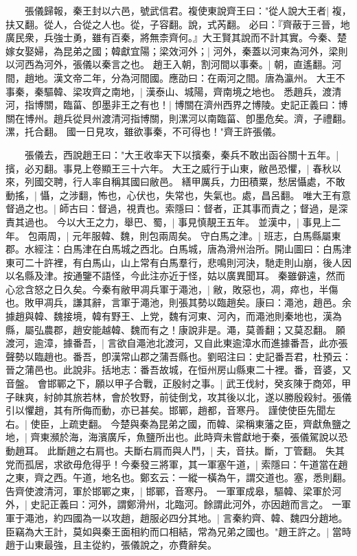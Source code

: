 　　張儀歸報，秦王封以六邑，號武信君。複使東說齊王曰："從人說大王者|{
	複，扶又翻。從人，合從之人也。從，子容翻。說，式芮翻。
	}
必曰：『齊蔽于三晉，地廣民衆，兵強士勇，雖有百秦，將無柰齊何。』大王賢其說而不計其實。今秦、楚嫁女娶婦，為昆弟之國；韓獻宜陽；梁效河外；|{
	河外，秦蓋以河東為河外，梁則以河西為河外，張儀以秦言之也。
	}
趙王入朝，割河間以事秦。|{
	朝，直遙翻。河間，趙地。漢文帝二年，分為河間國。應劭曰：在兩河之間。唐為瀛州。
	}
大王不事秦，秦驅韓、梁攻齊之南地，|{
	漢泰山、城陽，齊南境之地也。
	}
悉趙兵，渡清河，指博關，臨菑、卽墨非王之有也！|{
	博關在濟州西界之博陵。史記正義曰：博關在博州。趙兵從貝州渡清河指博關，則漯河以南臨菑、卽墨危矣。濟，子禮翻。漯，托合翻。
	}
國一日見攻，雖欲事秦，不可得也！"齊王許張儀。

　　張儀去，西說趙王曰："大王收率天下以擯秦，秦兵不敢出函谷關十五年。|{
	擯，必刃翻。事見上卷顯王三十六年。
	}
大王之威行于山東，敝邑恐懼，|{
	春秋以來，列國交聘，行人率自稱其國曰敝邑。
	}
繕甲厲兵，力田積粟，愁居懾處，不敢動搖，|{
	懾，之涉翻，怖也，心伏也，失常也，失氣也。處，昌呂翻。
	}
唯大王有意督過之也。|{
	師古曰：督過，視責也。索隱曰：督者，正其事而責之；督過，是深責其過也。
	}
今以大王之力，舉巴、蜀，|{
	事見慎靚王五年。
	}
並漢中，|{
	事見上二年。
	}
包兩周，|{
	元年服韓、魏，則包兩周矣。
	}
守白馬之津。|{
	班志，白馬縣屬東郡。水經注：白馬津在白馬城之西北。白馬城，唐為滑州治所。開山圖曰：白馬津東可二十許裡，有白馬山，山上常有白馬羣行，悲鳴則河決，馳走則山崩，後人因以名縣及津。按通鑒不語怪，今此注亦近于怪，姑以廣異聞耳。
	}
秦雖僻遠，然而心忿含怒之日久矣。今秦有敝甲凋兵軍于澠池，|{
	敝，敗惡也，凋，瘁也，半傷也。敗甲凋兵，謙其辭，言軍于澠池，則張其勢以臨趙矣。康曰：澠池，趙邑。余據趙與韓、魏接境，韓有野王、上党，魏有河東、河內，而澠池則秦地也，漢為縣，屬弘農郡，趙安能越韓、魏而有之！康說非是。澠，莫善翻；又莫忍翻。
	}
願渡河，逾漳，據番吾，|{
	言欲自澠池北渡河，又自此東逾漳水而進據番吾，此亦張聲勢以臨趙也。番吾，卽漢常山郡之蒲吾縣也。劉昭注曰：史記番吾君，杜預云：晉之蒲邑也。此說非。括地志：番吾故城，在恒州房山縣東二十裡。番，音婆，又音盤。
	}
會邯鄲之下，願以甲子合戰，正殷紂之事。|{
	武王伐紂，癸亥陳于商郊，甲子昧爽，紂帥其旅若林，會於牧野，前徒倒戈，攻其後以北，遂以勝殷殺紂。張儀引以懼趙，其有所侮而動，亦已甚矣。邯鄲，趙都，音寒丹。
	}
謹使使臣先聞左右。|{
	使臣，上疏吏翻。
	}
今楚與秦為昆弟之國，而韓、梁稱東藩之臣，齊獻魚鹽之地，|{
	齊東瀕於海，海濱廣斥，魚鹽所出也。此時齊未嘗獻地于秦，張儀駕說以恐動趙耳。
	}
此斷趙之右肩也。夫斷右肩而與人鬥，|{
	夫，音扶。斷，丁管翻。
	}
失其党而孤居，求欲毋危得乎！今秦發三將軍，其一軍塞午道，|{
	索隱曰：午道當在趙之東，齊之西。午道，地名也。鄭玄云：一縱一橫為午，謂交道也。塞，悉則翻。
	}
告齊使渡清河，軍於邯鄲之東，|{
	邯鄲，音寒丹。
	}
一軍軍成皋，驅韓、梁軍於河外，|{
	史記正義曰：河外，謂鄭滑州，北臨河。餘謂此河外，亦因趙而言之。
	}
一軍軍于澠池，約四國為一以攻趙，趙服必四分其地。|{
	言秦約齊、韓、魏四分趙地。
	}
臣竊為大王計，莫如與秦王面相約而口相結，常為兄弟之國也。"趙王許之。|{
	當時趙于山東最強，且主從約，張儀說之，亦費辭矣。
	}


